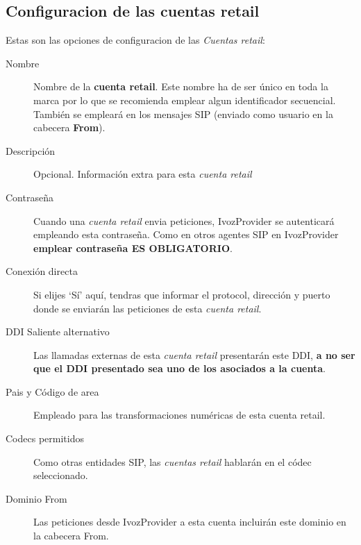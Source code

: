 \documentclass[letterpaper,10pt,spanish]{sphinxmanual}
\begin{document}
\subsection{Configuracion de las cuentas retail}
\label{retail/retail_accounts:retail-accounts-configuration}
Estas son las opciones de configuracion de las \emph{Cuentas retail}:
\begin{description}
\item[{Nombre}] \leavevmode{}\label{retail/retail_accounts:term-name}
Nombre de la \textbf{cuenta retail}. Este nombre ha de ser único en toda la marca por lo que se recomienda emplear algun identificador secuencial. También se empleará en los mensajes SIP (enviado como usuario en la cabecera \textbf{From}).

\item[{Descripción}] \leavevmode{}\label{retail/retail_accounts:term-description}
Opcional. Información extra para esta \emph{cuenta retail}

\item[{Contraseña}] \leavevmode{}\label{retail/retail_accounts:term-password}
Cuando una \emph{cuenta retail} envia peticiones, IvozProvider se autenticará empleando esta contraseña. Como en otros agentes SIP en IvozProvider \textbf{emplear contraseña ES OBLIGATORIO}.

\item[{Conexión directa}] \leavevmode{}\label{retail/retail_accounts:term-direct-connection}
Si elijes `Sí' aquí, tendras que informar el protocol, dirección y puerto donde se enviarán las peticiones de esta \emph{cuenta retail}.

\item[{DDI Saliente alternativo}] \leavevmode{}\label{retail/retail_accounts:term-fallback-outgoing-ddi}
Las llamadas externas de esta \emph{cuenta retail} presentarán este DDI, \textbf{a no ser que el DDI presentado sea uno de los asociados a la cuenta}.

\item[{Pais y Código de area}] \leavevmode{}\label{retail/retail_accounts:term-country-and-area-code}
Empleado para las transformaciones numéricas de esta cuenta retail.

\item[{Codecs permitidos}] \leavevmode{}\label{retail/retail_accounts:term-allowed-codecs}
Como otras entidades SIP, las \emph{cuentas retail} hablarán en el códec seleccionado.

\item[{Dominio From}] \leavevmode{}\label{retail/retail_accounts:term-from-domain}
Las peticiones desde IvozProvider a esta cuenta incluirán este dominio en la cabecera From.

\end{description}
\end{document}
